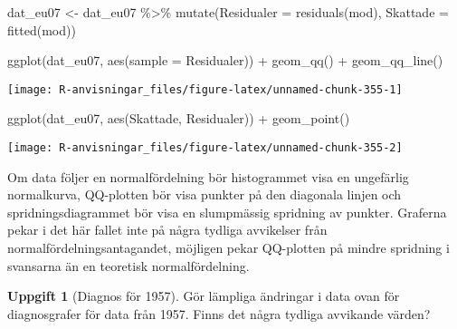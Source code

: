 \documentclass[
]{book}
\newenvironment{Shaded}{\begin{snugshade}}{\end{snugshade}}
\newcommand{\AttributeTok}[1]{\textcolor[rgb]{0.77,0.63,0.00}{#1}}
\newcommand{\FunctionTok}[1]{\textcolor[rgb]{0.00,0.00,0.00}{#1}}
\newcommand{\NormalTok}[1]{#1}
\newcommand{\OtherTok}[1]{\textcolor[rgb]{0.56,0.35,0.01}{#1}}
\newcommand{\SpecialCharTok}[1]{\textcolor[rgb]{0.00,0.00,0.00}{#1}}
\theoremstyle{definition}
\theoremstyle{definition}
\theoremstyle{definition}
\newtheorem{exercise}{Uppgift}[chapter]
\theoremstyle{definition}
\theoremstyle{remark}
\begin{document}
\begin{Shaded}
\begin{Highlighting}[]
\NormalTok{dat\_eu07 }\OtherTok{\textless{}{-}}\NormalTok{ dat\_eu07 }\SpecialCharTok{\%\textgreater{}\%} 
  \FunctionTok{mutate}\NormalTok{(}\AttributeTok{Residualer =} \FunctionTok{residuals}\NormalTok{(mod),}
         \AttributeTok{Skattade =} \FunctionTok{fitted}\NormalTok{(mod))}

\FunctionTok{ggplot}\NormalTok{(dat\_eu07, }\FunctionTok{aes}\NormalTok{(}\AttributeTok{sample =}\NormalTok{ Residualer)) }\SpecialCharTok{+} \FunctionTok{geom\_qq}\NormalTok{() }\SpecialCharTok{+} \FunctionTok{geom\_qq\_line}\NormalTok{()}
\end{Highlighting}
\end{Shaded}

\begin{center}\texttt{[image: R-anvisningar\_files/figure-latex/unnamed-chunk-355-1]} \end{center}

\begin{Shaded}
\begin{Highlighting}[]
\FunctionTok{ggplot}\NormalTok{(dat\_eu07, }\FunctionTok{aes}\NormalTok{(Skattade, Residualer)) }\SpecialCharTok{+} \FunctionTok{geom\_point}\NormalTok{()}
\end{Highlighting}
\end{Shaded}

\begin{center}\texttt{[image: R-anvisningar\_files/figure-latex/unnamed-chunk-355-2]} \end{center}

Om data följer en normalfördelning bör histogrammet visa en ungefärlig normalkurva, QQ-plotten bör visa punkter på den diagonala linjen och spridningsdiagrammet bör visa en slumpmässig spridning av punkter. Graferna pekar i det här fallet inte på några tydliga avvikelser från normalfördelningsantagandet, möjligen pekar QQ-plotten på mindre spridning i svansarna än en teoretisk normalfördelning.

\begin{exercise}[Diagnos för 1957]
Gör lämpliga ändringar i data ovan för diagnosgrafer för data från 1957. Finns det några tydliga avvikande värden?
\end{exercise}
\end{document}
